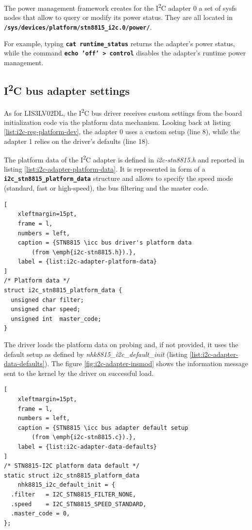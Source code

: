 \documentclass[a4paper,10pt]{article}
\newcommand{\icc}{I\textsuperscript{2}C }
\newcommand{\keyword}[1]{\texttt{\textbf{#1}}}
\begin{document}
\begin{multicols}{2}
The power management framework creates for the \icc adapter 0 a set of sysfs
nodes that allow to query or modify its power status. They are all located in \keyword{/sys/devices/platform/stn8815\_i2c.0/power/}.

For example, typing \keyword{cat runtime\_status} returns the adapter's power
status, while the command \keyword{echo 'off' > control} disables the adapter's
runtime power management.


\subsection{\icc bus adapter settings}
\label{sec:adapter_settings}

As for LIS3LV02DL, the \icc bus driver receives custom settings from the board
initialization code via the platform data mechanism.
Looking back at listing \ref{list:i2c-reg-platform-dev}, the adapter 0 uses a
custom setup (line 8), while the adapter 1 relies on the driver's defaults
(line 18).

The platform data of the \icc adapter is defined in \emph{i2c-stn8815.h} and
reported in listing \ref{list:i2c-adapter-platform-data}.
It is represented in form of a \keyword{i2c\_stn8815\_platform\_data} structure
and allows to specify the speed mode (standard, fast or high-speed), 
the bus filtering and the master code.

\begin{lstlisting}[
	xleftmargin=15pt,
	frame = l,
	numbers = left,
	caption = {STN8815 \icc bus driver's platform data
		(from \emph{i2c-stn8815.h}).},
	label = {list:i2c-adapter-platform-data}
]
/* Platform data */
struct i2c_stn8815_platform_data {
  unsigned char filter;
  unsigned char speed;
  unsigned int  master_code;
}
\end{lstlisting}

The driver loads the platform data on probing and, if not provided, it uses the default setup as defined by \emph{nhk8815\_i2c\_default\_init}
(listing \ref{list:i2c-adapter-data-defaults}).
The figure \ref{fig:i2c-adapter-insmod} shows the information message sent to
the kernel by the driver on successful load.

\begin{lstlisting}[
	xleftmargin=15pt,
	frame = l,
	numbers = left,
	caption = {STN8815 \icc bus adapter default setup
		(from \emph{i2c-stn8815.c}).},
	label = {list:i2c-adapter-data-defaults}
]
/* STN8815-I2C platform data default */
static struct i2c_stn8815_platform_data
	nhk8815_i2c_default_init = {
  .filter	= I2C_STN8815_FILTER_NONE,
  .speed	= I2C_STN8815_SPEED_STANDARD,
  .master_code = 0,
};
\end{lstlisting}


\end{multicols}
\end{document}
